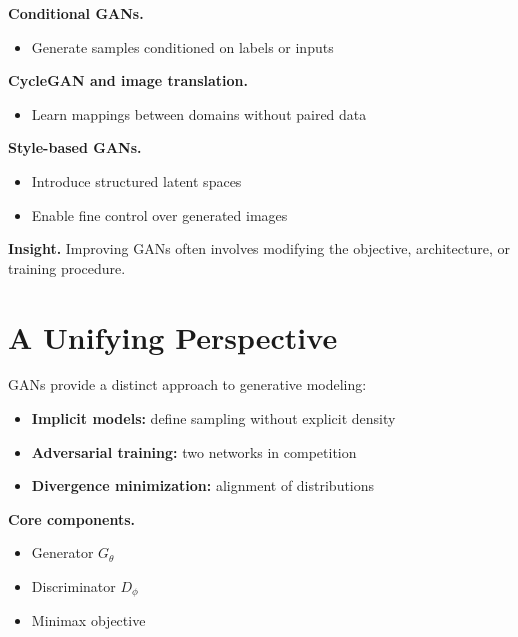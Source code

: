 \medskip

\noindent
\textbf{Conditional GANs.}
\begin{itemize}
    \item Generate samples conditioned on labels or inputs
\end{itemize}

\medskip

\noindent
\textbf{CycleGAN and image translation.}
\begin{itemize}
    \item Learn mappings between domains without paired data
\end{itemize}

\medskip

\noindent
\textbf{Style-based GANs.}
\begin{itemize}
    \item Introduce structured latent spaces
    \item Enable fine control over generated images
\end{itemize}

\medskip

\noindent
\textbf{Insight.}  
Improving GANs often involves modifying the objective, architecture, or training procedure.

\section{A Unifying Perspective}

GANs provide a distinct approach to generative modeling:

\begin{itemize}
    \item \textbf{Implicit models:} define sampling without explicit density
    \item \textbf{Adversarial training:} two networks in competition
    \item \textbf{Divergence minimization:} alignment of distributions
\end{itemize}

\medskip

\noindent
\textbf{Core components.}
\begin{itemize}
    \item Generator $G_\theta$
    \item Discriminator $D_\phi$
    \item Minimax objective
\end{itemize}

\medskip

